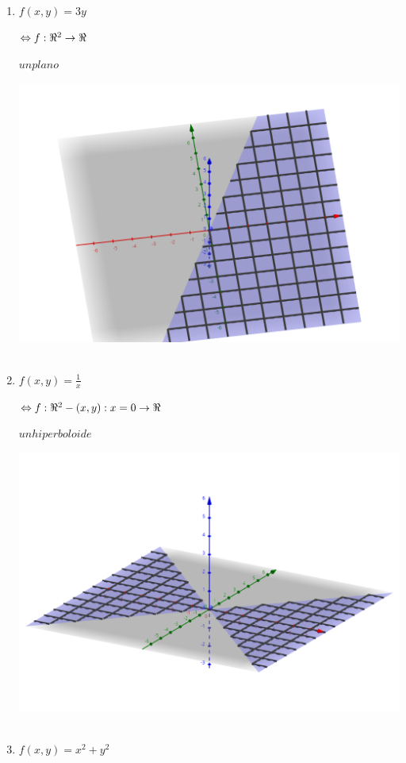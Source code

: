 \documentclass[../practica_02.tex]{subfiles}
\begin{document}
    \begin{enumerate}
        \item $f(x,y) = 3y$

            $ \Leftrightarrow f: \real^2 \rightarrow \real$

            $ un plano $

            \includegraphics[scale=0.4]{ej13/resources/a.png} $ $
            
        \item $ f(x,y) = \frac{1}{x}$
            
            $ \Leftrightarrow f: \real^2 - (x,y): x = 0 \rightarrow \real$

            $ un hiperboloide $

            \includegraphics[scale=0.4]{ej13/resources/b.png} $ $

        \item $ f(x,y) = x^2 + y^2$


\end{enumerate}
\end{document}

